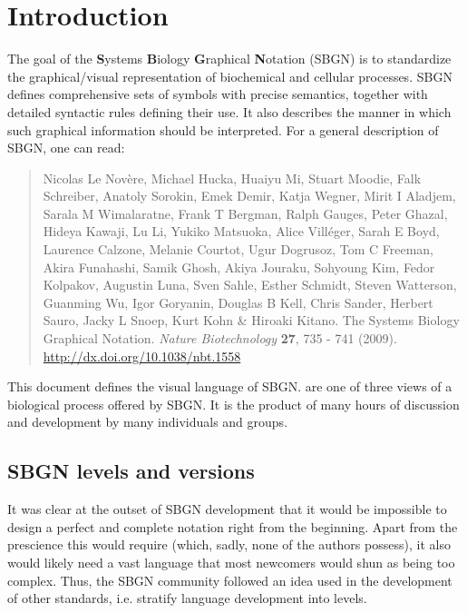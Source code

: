 

\chapter{Introduction}

The goal of the \textbf{S}ystems \textbf{B}iology \textbf{G}raphical 
\textbf{N}otation (SBGN) is to standardize the graphical/visual 
representation of biochemical and cellular processes. SBGN 
defines comprehensive sets of symbols with precise semantics, together with 
detailed syntactic rules defining their use.  It also describes the manner 
in which such graphical information should be interpreted. For a general 
description of SBGN, one can read:

\begin{quote}
 Nicolas Le Nov\`{e}re, Michael Hucka, Huaiyu Mi, Stuart Moodie, Falk 
Schreiber, Anatoly Sorokin, Emek Demir, Katja Wegner, Mirit I Aladjem, 
Sarala M Wimalaratne, Frank T Bergman, Ralph Gauges, Peter Ghazal, Hideya 
Kawaji, Lu Li, Yukiko Matsuoka, Alice Vill\'{e}ger, Sarah E Boyd, Laurence 
Calzone, Melanie Courtot, Ugur Dogrusoz, Tom C Freeman, Akira Funahashi, 
Samik Ghosh, Akiya Jouraku, Sohyoung Kim, Fedor Kolpakov, Augustin Luna, 
Sven Sahle, Esther Schmidt, Steven Watterson, Guanming Wu, Igor Goryanin, 
Douglas B Kell, Chris Sander, Herbert Sauro, Jacky L Snoep, Kurt Kohn  \& 
Hiroaki Kitano. The Systems Biology Graphical Notation. \emph{Nature 
Biotechnology} \textbf{27}, 735 - 741 (2009).  \url{http://dx.doi.org/10.1038/nbt.1558}
\end{quote}

This document defines the \emph{\PD{}} visual language of SBGN. \PDs are 
one of three views of a biological process offered by SBGN.  It is the 
product of many hours of discussion and development by many individuals and 
groups.

\section{SBGN levels and versions}
\label{sec:sbgn-levels}

It was clear at the outset of SBGN development that it would be impossible 
to design a perfect and complete notation right from the beginning.  Apart 
from the prescience this would require (which, sadly, none of the authors 
possess), it also would likely need a vast language that most newcomers 
would shun as being too complex.  Thus, the SBGN community followed an idea 
used in the development of other standards, i.e. stratify language 
development into levels.


